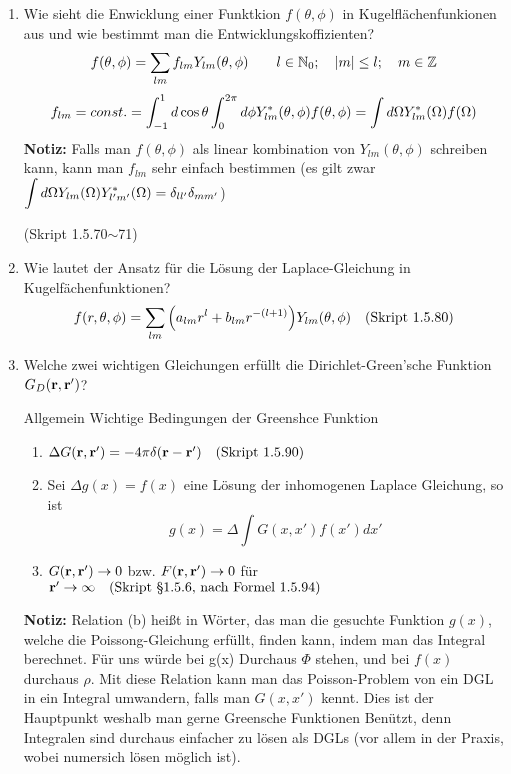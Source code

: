 \begin{enumerate}
  \item Wie sieht die Enwicklung einer Funktkion $f(\theta,\phi)$ in
        Kugelflächenfunkionen aus und wie bestimmt man die 
        Entwicklungskoffizienten?
        $$\displaystyle f(\theta, \phi)=\sum_{lm} f_{lm}Y_{lm}(\theta,\phi)
        \qquad l\in \mathbb{N}_0;\quad \abs{m}\le l; 
        \quad m\in\mathbb{Z}$$
        $$\displaystyle f_{lm}=const.
         =\int_{-1}^{1} d\cos\theta\int_0^{2\pi}d\phi 
         Y^*_{lm}(\theta,\phi)f(\theta,\phi)
         =\int d\Omega Y^*_{lm}(\Omega)f(\Omega)$$
         \textbf{Notiz:} Falls man $f(\theta,\phi)$ als linear kombination
         von $Y_{lm}(\theta,\phi)$ schreiben kann, kann man $f_{lm}$
         sehr einfach bestimmen (es gilt zwar $\displaystyle \int d\Omega 
         Y_{lm}(\Omega)Y_{l'm'}^*(\Omega)=\delta_{ll'}\delta_{mm'}$)
        \begin{center}
          (Skript 1.5.70$\sim$71)
        \end{center}

  \item Wie lautet der Ansatz für die Lösung der Laplace-Gleichung in
        Kugelfächenfunktionen?\\
        $$f(r,\theta,\phi)=
        \sum_{lm}\qty(a_{lm}r^l+b_{lm}r^{-(l+1)})Y_{lm}(\theta,\phi)
        \quad\text{(Skript 1.5.80)}$$
         
  \item Welche zwei wichtigen Gleichungen erfüllt die Dirichlet-Green'sche
        Funktion $G_D(\vb r, \vb r')$?

        Allgemein Wichtige Bedingungen der Greenshce Funktion
        \begin{center}
          \begin{enumerate}
            \item $\Delta G(\vb r, \vb r') = -4\pi\delta(\vb r -\vb r')
              \quad\text{(Skript 1.5.90)}$
            \item Sei $\Delta g(x) = f(x)$ eine Lösung der inhomogenen  
              Laplace Gleichung, so ist 
              $$ g(x)=\Delta\int G(x,x')f(x')dx'$$
            \item $G(\vb r, \vb r') \to 0$ bzw. $F(\vb r, \vb r')\to 0$ 
              für $\vb r'\to\infty
              \quad\text{(Skript §1.5.6, nach Formel 1.5.94)}$
          \end{enumerate}
        \end{center}
        \textbf{Notiz:} Relation (b) heißt in Wörter, das man die gesuchte
        Funktion $g(x)$, welche die Poissong-Gleichung erfüllt, finden
        kann, indem man das Integral berechnet. Für uns würde bei g(x)
        Durchaus $\Phi$ stehen, und bei $f(x)$ durchaus $\rho$.
        Mit diese Relation kann man das 
        Poisson-Problem
        von ein DGL in ein Integral umwandern, falls man $G(x,x')$ kennt.
        Dies ist der Hauptpunkt weshalb man gerne Greensche Funktionen
        Benützt, denn Integralen sind durchaus einfacher 
        zu lösen als DGLs (vor allem in der Praxis, wobei numersich
        lösen möglich ist).


\end{enumerate}
